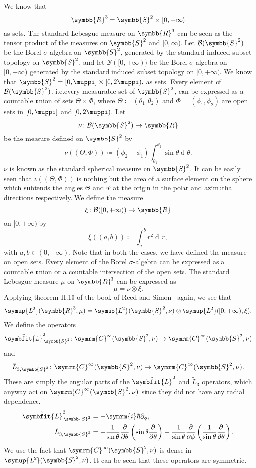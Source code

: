 \documentclass[12pt, a4 paper]{article}
\let\symcal\mathcal
\theoremstyle{definition}
\newcommand{\ltwo}{\symup{L\kern-0.5pt^2}}
\newcommand{\rthree}{\symbb{R}^3}
\newcommand{\rr}{\symbb{R}}
\renewcommand{\i}{\symrm{i}}
\renewcommand{\pi}{\muppi}
\newcommand{\lvecsquare}{\tilde{\symbfit{L}}^2}
\newcommand{\der}{\operatorname{d\!}{}}
\begin{document}
    We know that \[\rthree = \symbb{S}^2 \times [0, +\infty)\] as sets. The standard Lebesgue measure on $\rthree$ can be seen as the tensor product of the measures on $\symbb{S}^2$ and $[0, \infty)$. Let $\symcal{B}(\symbb{S}^2)$ be the Borel $\sigma$-algebra on $\symbb{S}^2$, generated by the standard induced subset topology on $\symbb{S}^2$, and let $\symcal{B}([0,+\infty))$ be the Borel $\sigma$-algebra on $[0, +\infty)$ generated by the standard induced subset topology on $[0, +\infty)$. We know that $\symbb{S}^2 = [0, \pi] \times [0, 2\pi),$ as sets. Every element of $\symcal{B}(\symbb{S}^2)$, i.e.\@ every measurable set of $\symbb{S}^2$, can be expressed as a countable union of sets $\Theta \times \Phi$, where $\Theta \coloneq (\theta_1, \theta_2)$ and $\Phi \coloneq (\phi_1, \phi_2)$ are open sets in $[0, \pi]$ and $[0, 2\pi)$. Let
    \[
        \nu \colon \symcal{B}(\symbb{S}^2) \rightarrow \rr
    \]
    be the measure defined on $\symbb{S}^2$ by
    \[
        \nu((\Theta, \Phi)) \coloneq (\phi_2 - \phi_1) \int_{\theta_1}^{\theta_2}\sin{\theta}\der \theta.
    \]
    $\nu$ is known as the standard spherical measure on $\symbb{S}^2$. It can be easily seen that $\nu((\Theta, \Phi))$ is nothing but the area of a surface element on the sphere which subtends the angles $\Theta$ and $\Phi$ at the origin in the polar and azimuthal directions respectively. We define the measure
    \[
        \xi \colon \symcal{B}([0, +\infty)) \rightarrow \rr
    \]
    on $[0, +\infty)$ by
    \[
        \xi((a, b)) \coloneq \int_a^b r^2\! \der r,
    \]
    with $a, b \in (0, +\infty)$. Note that in both the cases, we have defined the measure on open sets. Every element of the Borel $\sigma$-algebra can be expressed as a countable union or a countable intersection of the open sets. The standard Lebesgue measure $\mu$ on $\rthree$ can be expressed as
    \[
        \mu = \nu \otimes \xi.
    \]
    Applying theorem II.10 of the book of Reed and Simon~\cite[p.~52]{Reed} again, we see that
    \begin{align}
        \ltwo(\rthree, \mu) = \ltwo(\symbb{S}^2, \nu) \otimes \ltwo([0, +\infty), \xi).
    \end{align}
    We define the operators \[\lvecsquare_{\,\symbb{S}^2} \colon \symrm{C}^\infty(\symbb{S}^2, \nu) \rightarrow \symrm{C}^\infty(\symbb{S}^2, \nu)\] and \[\tilde{L}_{3, \symbb{S}^2} \colon \symrm{C}^\infty(\symbb{S}^2, \nu) \rightarrow \symrm{C}^\infty(\symbb{S}^2, \nu).\] These are simply the angular parts of the $\lvecsquare$ and $\tilde{L}_3$ operators, which anyway act on $\symrm{C}^\infty(\symbb{S}^2, \nu)$ since they did not have any radial dependence.
    \begin{align*}
        \lvecsquare_{\,\symbb{S}^2} &= -\i\hbar\partial_\phi,\\
        \tilde{L}_{3, \symbb{S}^2}  &= -\frac{1}{\sin{\theta}}\frac{\partial}{\partial \theta}\left(\sin{\theta}\frac{\partial}{\partial\theta}\right) -\frac{1}{\sin{\theta}}\frac{\partial}{\partial\phi}\left(\frac{1}{\sin{\theta}}\frac{\partial}{\partial\theta}\right).
    \end{align*}
    We use the fact that $\symrm{C}^\infty(\symbb{S}^2, \nu)$ is dense in $\ltwo(\symbb{S}^2, \nu)$. It can be seen that these operators are symmetric.
\end{document}
